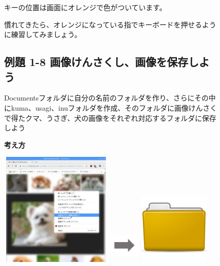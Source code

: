 \documentclass[a4paper,12pt]{jarticle}
\begin{document}
\begin{figure}[t]
{\begin{minipage}{4.88cm}
\bigskip

キーの位置は画面にオレンジで色がついています。


\bigskip

慣れてきたら、オレンジになっている指でキーボードを押せるように練習してみましょう。


\bigskip
\end{minipage}
	}

\bigskip
\bigskip
\bigskip
\bigskip
\end{figure}
\clearpage
\begin{figure}[t]
\subsection{例題 1-8
画像けんさくし、画像を保存しよう}
Documentsフォルダに自分の名前のフォルダを作り、さらにその中にkuma、usagi、inuフォルダを作成、そのフォルダに画像けんさくで得たクマ、うさぎ、犬の画像をそれぞれ対応するフォルダに保存しよう

\textbf{考え方}


\bigskip




	\centering
	\begin{minipage}{\textwidth}
\begin{minipage}{5.582cm}
\includegraphics[width=5.413cm,height=5.461cm]{textbook-img092.png}
\end{minipage}
\begin{minipage}{3.582cm}
	\includegraphics[width=1.505cm,height=1.707cm]{textbook-img073.png}
\end{minipage}
\begin{minipage}{5.582cm}
	\includegraphics[width=3.387cm,height=3.387cm]{textbook-img044.png}
\end{minipage}
	\end{minipage}



\end{figure}
\end{document}
